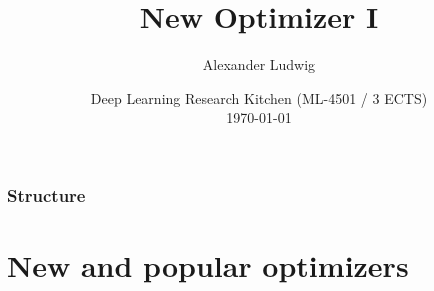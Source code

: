 \documentclass[
	11pt, %
	aspectratio=169, %
]{beamer}
\title[New Optimizer I]{New Optimizer I} %
\subtitle{} %
\author[]{Alexander Ludwig} %
\date[\today]{Deep Learning Research Kitchen (ML-4501 / 3 ECTS) \\ \today} %
\begin{document}

\begin{frame}
	\titlepage %
\end{frame}



\begin{frame}
	\frametitle{Structure} %
	
	\tableofcontents %
\end{frame}


\section{New and popular optimizers} %
\end{document}

